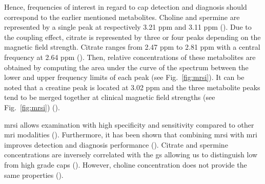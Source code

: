 \begin{enumerate}[leftmargin=*]
Hence, frequencies of interest in regard to \ac{cap} detection and diagnosis should correspond to the earlier mentioned metabolites. Choline and spermine are represented by a single peak at respectively 3.21 ppm and 3.11 ppm (\cite{Verma2010}). Due to the coupling effect, citrate is represented by three or four peaks depending on the magnetic field strength. Citrate ranges from 2.47 ppm to 2.81 ppm with a central frequency at 2.64 ppm (\cite{Verma2010}). Then, relative concentrations of these metabolites are obtained by computing the area under the curve of the spectrum between the lower and upper frequency limits of each peak (see Fig.~\ref{fig:mrsi}). It can be noted that a creatine peak is located at 3.02 ppm and the three metabolite peaks tend to be merged together at clinical magnetic field strengths (see Fig.~\ref{fig:mrsi}) (\cite{Hoeks2011,Graaf2000}).



\ac{mrsi} allows examination with high specificity and sensitivity compared to other \ac{mri} modalities (\cite{Choi2007}). Furthermore, it has been shown that combining \ac{mrsi} with \ac{mri} improves detection and diagnosis performance (\cite{Scheidler1999a,Kaji1998,Vilanova2009}). Citrate and spermine concentrations are inversely correlated with the \ac{gs} allowing us to distinguish low from high grade \acp{cap} (\cite{Giskeodegard2013}). However, choline concentration does not provide the same properties (\cite{Giskeodegard2013}).


\end{enumerate}
